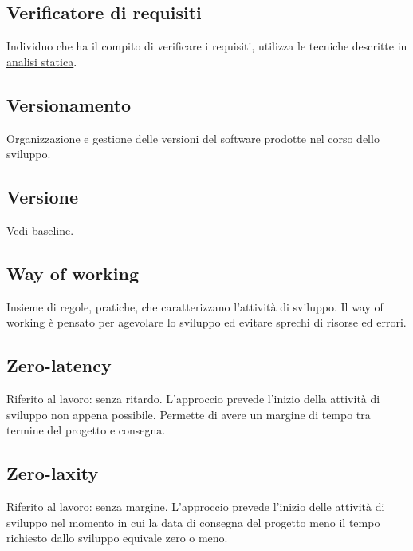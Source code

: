 	\subsection{Verificatore di requisiti}
	\label{sec:verificatorerequisiti}
	Individuo che ha il compito di verificare i requisiti, utilizza le tecniche descritte in \underline{\hyperref[sec:analisistatica]{analisi statica}}.
	
	\subsection{Versionamento}
	\label{sec:versionamento}
	Organizzazione e gestione delle versioni del software prodotte nel corso dello sviluppo.

	\subsection{Versione}
	\label{sec:versione}
	Vedi \underline{\hyperref[sec:baseline]{baseline}}. \newpage

	\subsection{Way of working}
	\label{sec:wow}
	Insieme di regole, pratiche, che caratterizzano l'attività di sviluppo. Il way of working è pensato per agevolare lo sviluppo ed evitare sprechi di risorse ed errori. \newpage

	
	
	\subsection{Zero-latency}
	\label{sec:zerolatency}
	Riferito al lavoro: senza ritardo. L'approccio prevede l'inizio della attività di sviluppo non appena possibile. Permette di avere un margine di tempo tra termine del progetto e consegna.
	
	\subsection{Zero-laxity}
	\label{sec:zerolaxity}
	Riferito al lavoro: senza margine. L'approccio prevede l'inizio delle attività di sviluppo nel momento in cui la data di consegna del progetto meno il tempo richiesto dallo sviluppo equivale zero o meno. 
